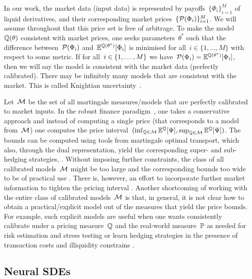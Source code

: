 In our work, the market data (input data) is represented by payoffs~$\{\Phi_i\}_{i=1}^M$ of liquid derivatives, and their corresponding market prices~$\{\mathcal{P}(\Phi_i)\}_{i=1}^{M}$.
We will assume throughout that this price set is free of arbitrage. 
To make the model~$\mathbb{Q}(\theta)$ consistent with market prices, one seeks parameters~$\theta^{*}$ such that 
the difference between~$\mathcal{P}(\Phi_i)$ and~$\mathbb{E}^{\mathbb{Q}(\theta^*)}[\Phi_i]$ is minimised for all~$i\in\{1,\ldots,M\}$ with respect to some metric.
If for all~$i\in\nobreak\{1,\ldots,M\}$  we have~$\mathcal{P}(\Phi_i) = \mathbb{E}^{\mathbb{Q}(\theta^*)}[\Phi_i]$, then we will say the model is consistent with the market data (perfectly calibrated).
There may be infinitely many models that are consistent with the market.
This is called Knightian uncertainty~\cite{Watkins1922KnightsProfit,Cohen2018DataApproach}. 



Let~$\mathcal{M}$  be the set of all martingale measures/models that are perfectly calibrated to market inputs. 
In the robust finance paradigm~\cite{Hobson1998RobustOption, Cox2011RobustOptions}, one takes a conservative approach and instead of computing a single price (that corresponds to a model from~$\mathcal{M}$) one computes the price interval~$(\inf_{\mathbb{Q} \in \mathcal{M}}\mathbb{E}^{\mathbb{Q} }[\Psi],\sup_{\mathbb{Q} \in \mathcal{M}}\mathbb{E}^{\mathbb{Q} }[\Psi])$. The bounds can be computed using tools from martingale optimal transport, which also, through the dual representation, yield the corresponding super- and sub-hedging strategies, \cite{Beiglbock2013Model-independentApproach}. Without imposing further constraints, the class of all calibrated models~$\mathcal{M}$ might be too large and the corresponding bounds too wide to be of practical use \cite{Eckstein2019RobustNumerics}. There is, however, an effort to incorporate further market information to tighten the pricing interval \cite{Nadtochiy2017RobustSkew}. Another shortcoming of working with the entire class of calibrated models~$\mathcal{M}$ is that, in general, it is not clear how to obtain a practical/explicit model out of the measures that yield the price bounds. For example, such explicit models are useful when one wants consistently calibrate under a pricing measure~$\mathbb{Q}$ and the real-world measure~$\mathbb{P}$ as needed for risk estimation and stress testing \cite{Broadie2011EfficientSimulation, Pelsser2016TheModeling} or learn hedging strategies in the presence of transaction costs and illiquidity constrains \cite{Buehler2019DeepHedging}.

\subsection{Neural SDEs}\label{sec nsdes}

